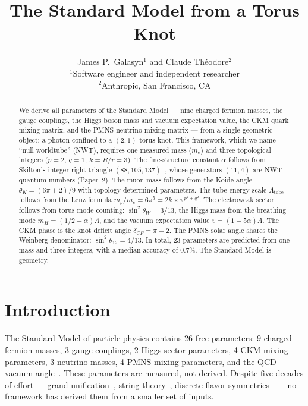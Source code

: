 \documentclass[11pt,a4paper]{article}
\title{\textbf{The Standard Model from a Torus Knot}}
\author{
  James P.\ Galasyn$^{1}$ and Claude Th\'eodore$^{2}$ \\[6pt]
  \small $^{1}$Software engineer and independent researcher \\
  \small $^{2}$Anthropic, San Francisco, CA
}
\date{}
\begin{document}
\maketitle

\begin{abstract}
We derive all parameters of the Standard Model --- nine charged fermion masses, the gauge couplings, the Higgs boson mass and vacuum expectation value, the CKM quark mixing matrix, and the PMNS neutrino mixing matrix --- from a single geometric object: a photon confined to a $(2,1)$ torus knot. This framework, which we name ``null worldtube'' (NWT), requires one measured mass ($m_e$) and three topological integers ($p=2$, $q=1$, $k=R/r=3$). The fine-structure constant $\alpha$ follows from Skilton's integer right triangle $(88, 105, 137)$~\cite{skilton1986,skilton1987,skilton1988}, whose generators $(11, 4)$ are NWT quantum numbers (Paper~2). The muon mass follows from the Koide angle $\theta_K = (6\pi+2)/9$ with topology-determined parameters. The tube energy scale $\Lambda_{\text{tube}}$ follows from the Lenz formula $m_p/m_e = 6\pi^5 = 2k \times \pi^{p^2+q^2}$. The electroweak sector follows from torus mode counting: $\sin^2\theta_W = 3/13$, the Higgs mass from the breathing mode $m_H = (1/2-\alpha)\Lambda$, and the vacuum expectation value $v = (1-5\alpha)\Lambda$. The CKM phase is the knot deficit angle $\delta_{CP} = \pi-2$. The PMNS solar angle shares the Weinberg denominator: $\sin^2\theta_{12} = 4/13$. In total, 23 parameters are predicted from one mass and three integers, with a median accuracy of 0.7\%. The Standard Model is geometry.
\end{abstract}

\section{Introduction}
\label{sec:intro}

The Standard Model of particle physics contains 26 free parameters: 9 charged fermion masses, 3 gauge couplings, 2 Higgs sector parameters, 4 CKM mixing parameters, 3 neutrino masses, 4 PMNS mixing parameters, and the QCD vacuum angle~\cite{pdg2022}. These parameters are measured, not derived. Despite five decades of effort --- grand unification~\cite{georgi1974}, string theory~\cite{bousso2000}, discrete flavor symmetries~\cite{ma2001,altarelli2006} --- no framework has derived them from a smaller set of inputs.
\end{document}
